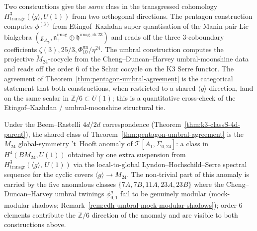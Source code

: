 \begin{remark}
\label{rem:two-compute-modules-agree}
Two constructions give the \emph{same} class in the transgressed
cohomology $H^3_{\mathrm{transgr}}(\langle g\rangle, U(1))$ from two
orthogonal directions.  The pentagon construction computes
$\phi^{(3)}$ from Etingof--Kazhdan
super-quantisation of the Manin-pair Lie bialgebra
$(\mathfrak{g}_{\Delta_5},\mathfrak{n}_+^{\mathrm{imag}}\oplus\mathfrak{h}^{\mathrm{imag,rk\,23}})$
and reads off the three $3$-coboundary coefficients
$\zeta(3), 25/3, \Phi_{10}^{\mathrm{un}}/\eta^{24}$. The umbral construction computes the projective
$\widetilde{M}_{24}$-cocycle from the Cheng--Duncan--Harvey umbral-moonshine data
and reads off the order $6$ of the Schur cocycle on the K3 Serre functor. The
agreement of Theorem~\ref{thm:pentagon-umbral-agreement} is the categorical
statement that both constructions, when restricted to a shared $\langle g\rangle$-direction,
land on the same scalar in $\mathbb{Z}/6 \subset U(1)$; this is a quantitative
cross-check of the Etingof--Kazhdan / umbral-moonshine structural tie.
\end{remark}

\begin{corollary}
\label{cor:M24-tHooft-anomaly}
Under the Beem--Rastelli $4d/2d$ correspondence
(Theorem~\ref{thm:k3-classS-4d-parent}), the shared class of
Theorem~\ref{thm:pentagon-umbral-agreement} is the $M_{24}$ global-symmetry
't~Hooft anomaly of $\mathcal{T}[A_1,\Sigma_{0,24}]$: a class in $H^4(B M_{24},
U(1))$ obtained by one extra suspension from $H^3_{\mathrm{transgr}}(\langle g
\rangle,\, U(1))$ via the local-to-global Lyndon--Hochschild--Serre spectral
sequence for the cyclic covers $\langle g\rangle\to M_{24}$. The non-trivial part
of this anomaly is carried by the five anomalous classes $\{7A, 7B, 11A, 23A, 23B\}$
where the Cheng--Duncan--Harvey umbral twinings $\phi^g_{0,1}$ fail to be genuinely
modular (mock-modular shadows; Remark~\ref{rem:cdh-umbral-mock-modular-shadows});
order-$6$ elements contribute the $\mathbb{Z}/6$ direction of the anomaly and are
visible to both constructions above.
\end{corollary}


